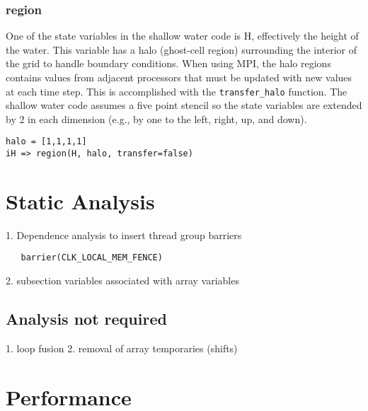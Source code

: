 \documentclass[10pt, conference, compsocconf]{IEEEtran}
\begin{document}
\subsubsection{region}

One of the state variables in the shallow water code is H, effectively the
height of the water.  This variable has a halo (ghost-cell region) surrounding
the interior of the grid to handle boundary conditions.  When using
MPI, the halo regions contains values from adjacent processors that must be
updated with new values at each time step.  This is accomplished with the
{\tt transfer\_halo} function.  The shallow water code assumes a five point stencil
so the state variables are extended by 2 in each dimension (e.g., by one to the
left, right, up, and down).

\begin{verbatim}
halo = [1,1,1,1]
iH => region(H, halo, transfer=false)
\end{verbatim}

\section{Static Analysis}

1. Dependence analysis to insert thread group barriers

\begin{verbatim}
   barrier(CLK_LOCAL_MEM_FENCE)
\end{verbatim}

2. subsection variables associated with array variables

\subsection{Analysis not required}

1. loop fusion
2. removal of array temporaries (shifts)

\section{Performance}
\end{document}
